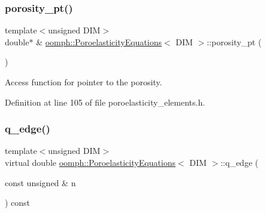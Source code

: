 \mbox{\label{classoomph_1_1PoroelasticityEquations_aff9d4a78384f1f0d7ebb8f14a2b12a27}} 
\subsubsection{\texorpdfstring{porosity\+\_\+pt()}{porosity\_pt()}}
{\footnotesize\ttfamily template$<$unsigned D\+IM$>$ \\
double$\ast$ \& \hyperlink{classoomph_1_1PoroelasticityEquations}{oomph\+::\+Poroelasticity\+Equations}$<$ D\+IM $>$\+::porosity\+\_\+pt (\begin{DoxyParamCaption}{ }\end{DoxyParamCaption})\hspace{0.3cm}{\ttfamily [inline]}}



Access function for pointer to the porosity. 



Definition at line 105 of file poroelasticity\+\_\+elements.\+h.

\mbox{\label{classoomph_1_1PoroelasticityEquations_a67d1df907b555608c1692efdd278a5d7}} 
\subsubsection{\texorpdfstring{q\+\_\+edge()}{q\_edge()}\hspace{0.1cm}{\footnotesize\ttfamily [1/2]}}
{\footnotesize\ttfamily template$<$unsigned D\+IM$>$ \\
virtual double \hyperlink{classoomph_1_1PoroelasticityEquations}{oomph\+::\+Poroelasticity\+Equations}$<$ D\+IM $>$\+::q\+\_\+edge (\begin{DoxyParamCaption}\item[{const unsigned \&}]{n }\end{DoxyParamCaption}) const\hspace{0.3cm}{\ttfamily [pure virtual]}}



